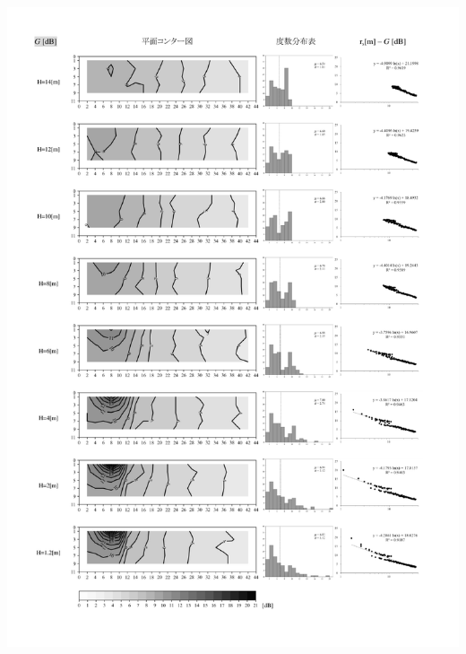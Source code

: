       \begin{minipage}{1\hsize}
        \centering
          \includegraphics[keepaspectratio,width=1\hsize,angle=0]
                          {04_att/Onkyo_rec3.pdf}
      \end{minipage}
\newpage
